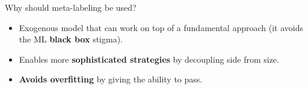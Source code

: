 \documentclass[usenames,dvipsnames]{beamer} %
\newcommand{\homeCOne}{../../Chapter 1 - Metalabeling/Draft}
\begin{document}
\begin{frame}{Why should meta-labeling be used?}
	\begin{itemize}
		\item Exogenous model that can work on top of a fundamental approach 
		(it avoids the ML \textbf{black box} stigma).
		
		\vspace{.25cm}
		\item Enables more \textbf{sophisticated strategies} by decoupling 
		side from size.
		
		\vspace{.25cm}
		\item \textbf{Avoids overfitting} by giving the ability to pass.
	\end{itemize}
	
\end{frame}

%
%
%
\end{document}
